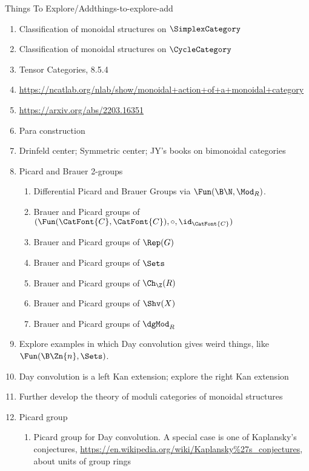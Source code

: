 \begin{remark}{Things To Explore/Add}{things-to-explore-add}
\begin{enumerate}
\begin{enumerate}
                \item Relative monad version of Day convolution
            \end{enumerate}
        \item Classification of monoidal structures on $\SimplexCategory$
        \item Classification of monoidal structures on $\CycleCategory$
        \item Tensor Categories, 8.5.4
        \item \url{https://ncatlab.org/nlab/show/monoidal+action+of+a+monoidal+category}
        \item \url{https://arxiv.org/abs/2203.16351}
        \item Para construction
        \item Drinfeld center; Symmetric center; JY's books on bimonoidal categories
        \item Picard and Brauer 2-groups
            \begin{enumerate}
                \item Differential Picard and Brauer Groups via $\Fun(\B\N,\Mod_{R})$.
                \item Brauer and Picard groups of $(\Fun(\CatFont{C},\CatFont{C}),\circ,\id_{\CatFont{C}})$
                \item Brauer and Picard groups of $\Rep(G)$
                \item Brauer and Picard groups of $\Sets$
                \item Brauer and Picard groups of $\Ch_{\Z}(R)$
                \item Brauer and Picard groups of $\Shv(X)$
                \item Brauer and Picard groups of $\dgMod_{R}$
            \end{enumerate}
        \item Explore examples in which Day convolution gives weird things, like $\Fun(\B\Zn{n},\Sets)$.
        \item Day convolution is a left Kan extension; explore the right Kan extension
        \item Further develop the theory of moduli categories of monoidal structures
        \item Picard group
            \begin{enumerate}
                \item Picard group for Day convolution. A special case is one of Kaplansky's conjectures, \url{https://en.wikipedia.org/wiki/Kaplansky\%27s_conjectures}, about units of group rings

\end{enumerate}
\end{enumerate}
\end{remark}
